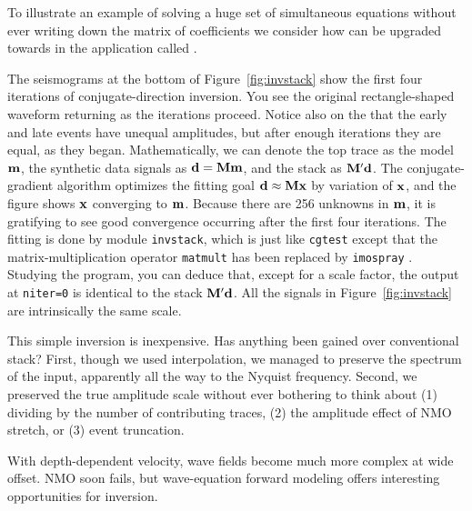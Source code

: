 To illustrate an example of solving a huge set of simultaneous
equations without ever writing down the matrix of coefficients
we consider how
{\it {}} can be upgraded towards
{\it {}} in the application called .
\par
The seismograms at the bottom of Figure~\ref{fig:invstack}
show the first four iterations of conjugate-direction inversion.
You see the original rectangle-shaped waveform returning
as the iterations proceed.
Notice also on the 
that the early and late events have unequal amplitudes,
but after enough iterations they are equal,
as they began.
Mathematically,
we can denote the top trace as the model $\bold m$,
the synthetic data signals as $\bold d = \bold M \bold m$,
and the stack as $\bold M' \bold d$.
The conjugate-gradient algorithm optimizes the fitting goal
$\bold d \approx \bold M \bold x$ by variation of $\bold x$,
and the figure shows $\bold x$ converging to $\bold m$.
Because there are 256 unknowns in $\bold m$,
it is gratifying to see good convergence occurring
after the first four iterations.
The fitting is done by module {\tt invstack},
which is just like
\texttt{cgtest}  except that the matrix-multiplication operator
\texttt{matmult}  has been replaced by
\texttt{imospray} .
Studying the program,
you can deduce that,
except for a scale factor,
the output at {\tt niter=0} is identical to the stack $\bold M' \bold d$.
All the signals in Figure~\ref{fig:invstack} are intrinsically the same scale.%
\par
This simple inversion is inexpensive.
Has anything been gained over conventional stack?
First,
though we used  interpolation,
we managed to preserve the spectrum of the input,
apparently all the way to the Nyquist frequency.
Second, we preserved the true amplitude scale
without ever bothering to think about
(1) dividing by the number of contributing traces,
(2) the amplitude effect of NMO stretch, or
(3) event truncation.
\par
With depth-dependent velocity,
wave fields become much more complex at wide offset.
NMO soon fails,
but wave-equation forward modeling
offers interesting opportunities for inversion.

